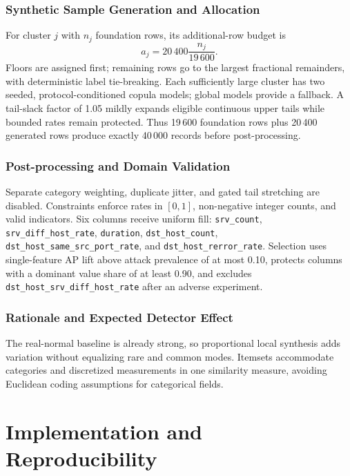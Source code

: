 \documentclass[10pt,a4paper]{article}
\begin{document}
\subsubsection{Synthetic Sample Generation and Allocation}
For cluster $j$ with $n_j$ foundation rows, its additional-row budget is
\begin{equation}
a_j=20\,400\frac{n_j}{19\,600}.
\end{equation}
Floors are assigned first; remaining rows go to the largest fractional remainders, with deterministic label tie-breaking. Each sufficiently large cluster has two seeded, protocol-conditioned copula models; global models provide a fallback. A tail-slack factor of 1.05 mildly expands eligible continuous upper tails while bounded rates remain protected. Thus 19\,600 foundation rows plus 20\,400 generated rows produce exactly 40\,000 records before post-processing.
\subsubsection{Post-processing and Domain Validation}
Separate category weighting, duplicate jitter, and gated tail stretching are disabled. Constraints enforce rates in $[0,1]$, non-negative integer counts, and valid indicators. Six columns receive uniform fill: \texttt{srv\_\allowbreak count}, \texttt{srv\_\allowbreak diff\_\allowbreak host\_\allowbreak rate}, \texttt{duration}, \texttt{dst\_\allowbreak host\_\allowbreak count}, \texttt{dst\_\allowbreak host\_\allowbreak same\_\allowbreak src\_\allowbreak port\_\allowbreak rate}, and \texttt{dst\_\allowbreak host\_\allowbreak rerror\_\allowbreak rate}. Selection uses single-feature AP lift above attack prevalence of at most 0.10, protects columns with a dominant value share of at least 0.90, and excludes \texttt{dst\_\allowbreak host\_\allowbreak srv\_\allowbreak diff\_\allowbreak host\_\allowbreak rate} after an adverse experiment.
\subsubsection{Rationale and Expected Detector Effect}
The real-normal baseline is already strong, so proportional local synthesis adds variation without equalizing rare and common modes. Itemsets accommodate categories and discretized measurements in one similarity measure, avoiding Euclidean coding assumptions for categorical fields.

\section{Implementation and Reproducibility}\label{sec:impl}
\end{document}
